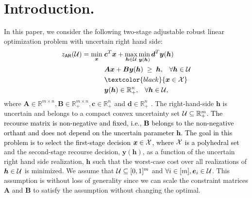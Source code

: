\documentclass[moor]{informs1}              %
\newcommand{\mb}[1]{\ensuremath{\boldsymbol{#1}}}
\newcommand*{\red}{\textcolor{black}}
\begin{document}
\maketitle




\section{Introduction.}
             
In this paper, we consider the following two-stage adjustable robust linear optimization problem with uncertain right hand side:
\begin{equation}\label{eq:ar}
\begin{aligned}
z_{\sf AR}({\cal U}) = \min_{\mb x} \; & \mb{c}^T \mb{x} + \max_{\mb{h}\in {\cal U}} \min_{\mb{y}(\mb{h})} \mb{d}^T \mb{y}(\mb{h}) \\
& \mb{A}\mb{x} + \mb{B}\mb{y}(\mb{h}) \; \geq \; \mb{h},   \; \; \; \forall \mb h \in {\cal U} \\
& \red{\mb{x}  \in  {\cal X} }\\
& \mb{y}(\mb{h}) \in  {\mathbb R}^{n}_+, \;  \; \; \forall \mb h \in {\cal U},
\end{aligned}
\end{equation}
where $\mb{A} \in {\mathbb R}^{m {\times} n},\mb{B} \in {\mathbb R}^{m {\times} n}_+, \mb{c}\in {\mathbb R}^{n}_+$ and $ \mb{d}\in {\mathbb R}^{n}_+$ . The right-hand-side $\mb{h}$ is uncertain and belongs to a compact convex uncertainty set ${\cal U}\subseteq{\mathbb R}^m_+$. \red{ The recourse matrix is non-negative and fixed, i.e., $\mb B$ belongs to the non-negative orthant and does not depend on the uncertain parameter $\mb h$.}
 \red{The goal in this problem is to select the first-stage decision $\mb{x} \in {\cal X}$, where $ {\cal X}$ is a polyhedral set }and the second-stage recourse decision,  $\mb y(\mb{h})$, as a function of the uncertain right hand side realization, $\mb{h}$ such that the worst-case cost over all realizations of $\mb h \in {\cal U}$ is minimized. We assume that  ${\cal U} \subseteq [ 0, 1]^m$ and  $\forall i \in [m], \mb e_i \in {\cal U}$. This assumption is without loss of generality since we can scale the constraint matrices $\mb A$ and $\mb B$ to satisfy the assumption without changing the optimal.
\end{document}
